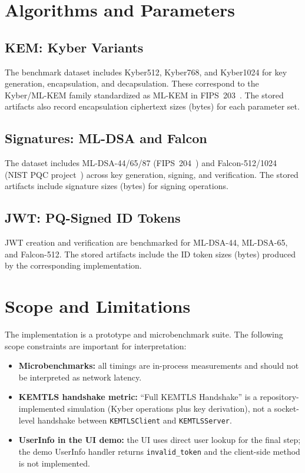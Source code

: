 \documentclass[conference]{IEEEtran}
\begin{document}
                \section{Algorithms and Parameters}
                \subsection{KEM: Kyber Variants}
                The benchmark dataset includes Kyber512, Kyber768, and Kyber1024 for key generation, encapsulation, and decapsulation. These correspond to the Kyber/ML-KEM family standardized as ML-KEM in FIPS~203~\cite{fips203}. The stored artifacts also record encapsulation ciphertext sizes (bytes) for each parameter set.
                
                \subsection{Signatures: ML-DSA and Falcon}
                The dataset includes ML-DSA-44/65/87 (FIPS~204~\cite{fips204}) and Falcon-512/1024 (NIST PQC project~\cite{nist-pqc}) across key generation, signing, and verification. The stored artifacts include signature sizes (bytes) for signing operations.
                
                \subsection{JWT: PQ-Signed ID Tokens}
                JWT creation and verification are benchmarked for ML-DSA-44, ML-DSA-65, and Falcon-512. The stored artifacts include the ID token sizes (bytes) produced by the corresponding implementation.
                
                \section{Scope and Limitations}
                The implementation is a prototype and microbenchmark suite. The following scope constraints are important for interpretation:
                \begin{itemize}
                  \item \textbf{Microbenchmarks:} all timings are in-process measurements and should not be interpreted as network latency.
                  \item \textbf{KEMTLS handshake metric:} ``Full KEMTLS Handshake'' is a repository-implemented simulation (Kyber operations plus key derivation), not a socket-level handshake between \texttt{KEMTLSClient} and \texttt{KEMTLSServer}.
                  \item \textbf{UserInfo in the UI demo:} the UI uses direct user lookup for the final step; the demo UserInfo handler returns \texttt{invalid\_token} and the client-side method is not implemented.
                \end{itemize}
\end{document}
